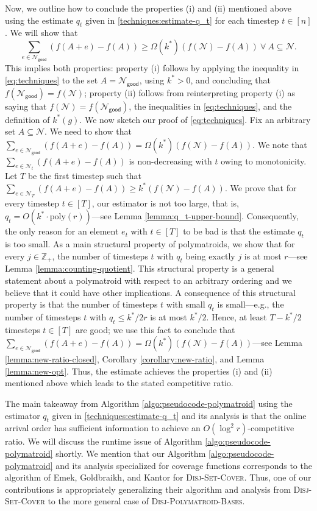 \documentclass[11pt]{article}
\theoremstyle{definition}
\newcommand{\calN}{{\mathcal{N}}}
\newcommand{\good}{\mathsf{good}}
\newcommand{\Z}{\mathbb{Z}}
\newcommand{\DPB}{\textsc{Disj-Polymatroid-Bases}\xspace}
\newcommand{\DSC}{\textsc{Disj-Set-Cover}\xspace}
\begin{document}
\iffalse
Now, we outline how to conclude the properties (i) and (ii) mentioned above using the estimate $q_t$ given in \eqref{techniques:estimate-q_t} for each timestep $t\in [n]$. We will show that 
\begin{equation}
\sum_{e\in \calN_{\good}} (f(A+e)-f(A))\ge \Omega(k^*)(f(\calN)-f(A)) \ \forall\ A\subseteq \calN. \label{eq:techniques}
\end{equation}
This implies both properties: property (i) follows by applying the inequality in \eqref{eq:techniques} to the set $A=\calN_{\good}$, using $k^*>0$, and concluding that $f(\calN_{\good})=f(\calN)$; property (ii) follows from reinterpreting property (i) as saying that $f(\calN)=f(\calN_{\good})$, the inequalities in \eqref{eq:techniques}, and the definition of $k^*(g)$. 
We now sketch our proof of \eqref{eq:techniques}. 
Fix an arbitrary set $A\subseteq \mathcal{N}$. We need to show that $\sum_{e\in \calN_{\good}}(f(A+e)-f(A))=\Omega(k^*)(f(\calN)-f(A))$. 
We note that $\sum_{e\in \mathcal{N}_t}(f(A+e)-f(A))$ is non-decreasing with $t$ owing to monotonicity. Let $T$ be the first timestep such that $\sum_{e\in \mathcal{N}_T}(f(A+e)-f(A))\ge k^* (f(\mathcal{N})-f(A))$. We prove that for every timestep $t\in [T]$, our estimator is not too large, that is, $q_t=O(k^*\cdot \text{poly}(r))$---see Lemma \ref{lemma:q_t-upper-bound}. Consequently, the only reason for an element $e_t$ with $t\in [T]$ to be bad is that the estimate $q_t$ is too small. As a main structural property of polymatroids, we show that for every $j\in \Z_+$, the number of timesteps $t$ with $q_t$ being exactly $j$ is at most $r$---see Lemma \ref{lemma:counting-quotient}. This structural property is a general statement about a polymatroid with respect to an arbitrary ordering and we believe that it could have other implications. A consequence of this structural property is that the number of timesteps $t$ with small $q_t$ is small---e.g., the number of timesteps $t$ with $q_t\le k^*/2r$ is at most $k^*/2$. Hence, at least $T-k^*/2$ timesteps $t\in [T]$ are good; we use this fact to conclude that $\sum_{e\in \calN_{\good}}(f(A+e)-f(A))=\Omega(k^*)(f(\calN)-f(A))$---see Lemma \ref{lemma:new-ratio-closed}, Corollary \ref{corollary:new-ratio}, and Lemma \ref{lemma:new-opt}. Thus, the estimate achieves the properties (i) and (ii) mentioned above which leads to the stated competitive ratio. 

The main takeaway from Algorithm \ref{algo:pseudocode-polymatroid} using the estimator $q_t$ given in \eqref{techniques:estimate-q_t} and its analysis is that the online arrival order has sufficient information to achieve an $O(\log^2 r)$-competitive ratio. We will discuss the runtime issue of Algorithm \ref{algo:pseudocode-polymatroid} shortly. We mention that our Algorithm \ref{algo:pseudocode-polymatroid} and its analysis specialized for coverage functions corresponds to the algorithm of Emek, Goldbraikh, and Kantor for \DSC \cite{EGK19}. Thus, one of our contributions is appropriately generalizing their algorithm and analysis from \DSC to the more general case of \DPB.  
\end{document}
